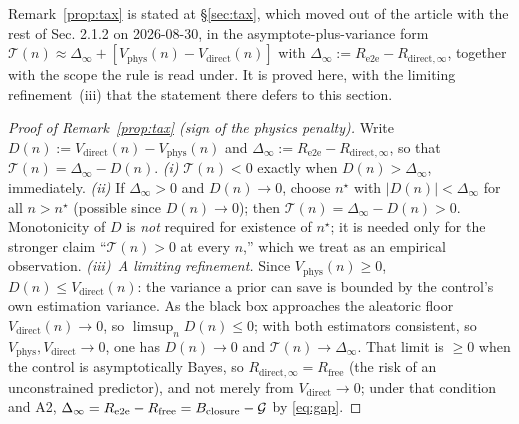 \noindent Remark~\ref{prop:tax} is stated at \S\ref{sec:tax}, which moved out of the article
with the rest of Sec. 2.1.2 on 2026-08-30, in the asymptote-plus-variance form
$\mathcal{T}(n)\approx\Delta_\infty+[V_{\mathrm{phys}}(n)-V_{\mathrm{direct}}(n)]$ with
$\Delta_\infty:=R_{\mathrm{e2e}}-R_{\mathrm{direct},\infty}$, together with the scope the rule is
read under. It is proved here, with the limiting refinement~(iii) that the statement there defers
to this section.
\begin{proof}[Proof of Remark~\ref{prop:tax} (sign of the physics penalty)]
\sloppy{} 
Write $D(n):=V_{\mathrm{direct}}(n)-V_{\mathrm{phys}}(n)$ and
$\Delta_\infty:=R_{\mathrm{e2e}}-R_{\mathrm{direct},\infty}$, so that
$\mathcal{T}(n)=\Delta_\infty-D(n)$.
\emph{(i)} $\mathcal{T}(n)<0$ exactly when $D(n)>\Delta_\infty$, immediately.
\emph{(ii)} If $\Delta_\infty>0$ and $D(n)\to0$, choose $n^\star$ with $|D(n)|<\Delta_\infty$
for all $n>n^\star$ (possible since $D(n)\to0$); then $\mathcal{T}(n)=\Delta_\infty-D(n)>0$. Monotonicity
of $D$ is \emph{not} required for existence of $n^\star$; it is needed only for the stronger
claim ``$\mathcal{T}(n)>0$ at every $n$,'' which we treat as an empirical observation.
\emph{(iii)~A limiting refinement.} Since $V_{\mathrm{phys}}(n)\ge0$, $D(n)\le V_{\mathrm{direct}}(n)$: the variance a
prior can save is bounded by the control's own estimation variance. As the black box approaches
the aleatoric floor $V_{\mathrm{direct}}(n)\to0$, so $\limsup_n D(n)\le0$; with both estimators
consistent, so $V_{\mathrm{phys}},V_{\mathrm{direct}}\to0$, one has $D(n)\to0$ and
$\mathcal{T}(n)\to\Delta_\infty$. That limit is $\ge0$ when the control is asymptotically Bayes, so
$R_{\mathrm{direct},\infty}=R_{\mathrm{free}}$ (the risk of an unconstrained predictor), and not
merely from $V_{\mathrm{direct}}\to0$; under that condition and A2,
$\Delta_\infty=R_{\mathrm{e2e}}-R_{\mathrm{free}}=B_{\mathrm{closure}}-\mathcal{G}$ by \eqref{eq:gap}.
\end{proof}

